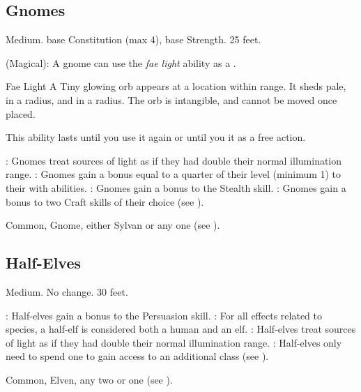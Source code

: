     \subsection{Gnomes}
         Medium.
          base Constitution (max 4),  base Strength.
         25 feet.
        \begin{itemize}
             (Magical): A gnome can use the \textit{fae light} ability as a .
                \begin{freeability}{Fae Light}
                    A Tiny glowing orb appears at a location within \rngmed range.
                    It sheds pale,  in a \areasmall radius, and  in a \areamed radius.
                    The orb is intangible, and cannot be moved once placed.

                    This ability lasts until you use it again or until you  it as a free action.
                \end{freeability}
            : Gnomes treat sources of light as if they had double their normal illumination range.
            : Gnomes gain a bonus equal to a quarter of their level (minimum 1) to their  with  abilities.
            : Gnomes gain a  bonus to the Stealth skill.
            : Gnomes gain a  bonus to two Craft skills of their choice (see ).
        \end{itemize}
         Common, Gnome, either Sylvan or any one  (see ).

    \subsection{Half-Elves}\label{Half-Elves}
         Medium.
         No change.
         30 feet.
        \begin{itemize}
            : Half-elves gain a  bonus to the Persuasion skill.
            : For all effects related to species, a half-elf is considered both a human and an elf.
            : Half-elves treat sources of light as if they had double their normal illumination range.
            : Half-elves only need to spend one  to gain access to an additional class (see ).
        \end{itemize}
         Common, Elven, any two  or one  (see ).

